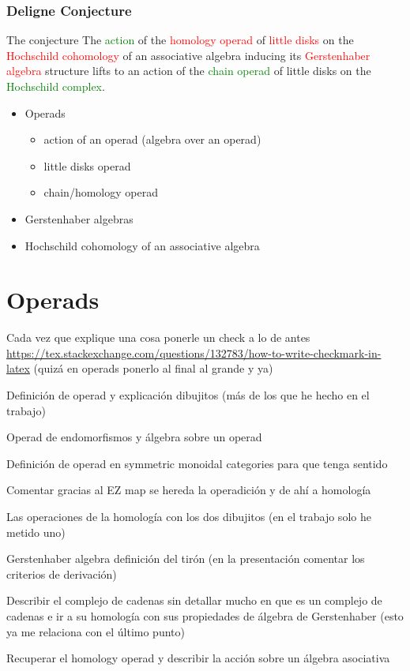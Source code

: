 \documentclass{beamer}
\theoremstyle{definition}
\begin{document}
\begin{frame}
	\frametitle{Deligne Conjecture}
	\begin{block}{The conjecture}
		The \textcolor{green}{action} of the \textcolor{red}{homology operad} of \textcolor{red}{little disks} on the \textcolor{red}{Hochschild cohomology} of an associative algebra inducing its \textcolor{red}{Gerstenhaber algebra} structure lifts to an action of the \textcolor{green}{chain operad} of little disks on the \textcolor{green}{Hochschild complex}.
	\end{block}
\end{frame}

\begin{frame}
	\begin{itemize}
		\item Operads
		\begin{itemize}
			\item action of an operad (algebra over an operad)
			\item little disks operad
			\item chain/homology operad			
		\end{itemize}
	\item Gerstenhaber algebras
	\item Hochschild cohomology of an associative algebra
	\end{itemize}
\end{frame}

\section{Operads}

\begin{frame}
	Cada vez que explique una cosa ponerle un check a lo de antes \url{https://tex.stackexchange.com/questions/132783/how-to-write-checkmark-in-latex} (quizá en operads ponerlo al final al grande y ya)
\end{frame}

\begin{frame}
	Definición de operad y explicación dibujitos (más de los que he hecho en el trabajo)
	
	Operad de endomorfismos y álgebra sobre un operad
	
	Definición de operad en symmetric monoidal categories para que tenga sentido
	
	Comentar gracias al EZ map se hereda la operadición y de ahí a homología
	
	Las operaciones de la homología con los dos dibujitos (en el trabajo solo he metido uno)
	
	Gerstenhaber algebra definición del tirón (en la presentación comentar los criterios de derivación)
	
	Describir el complejo de cadenas sin detallar mucho en que es un complejo de cadenas e ir a su homología con sus propiedades de álgebra de Gerstenhaber (esto ya me relaciona con el último punto)
	
	Recuperar el homology operad y describir la acción sobre un álgebra asociativa
\end{frame}
\end{document}
